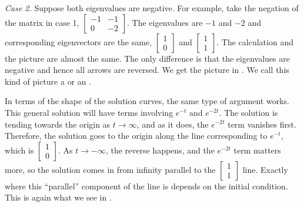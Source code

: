 \medskip

\emph{Case 2.} Suppose both eigenvalues are negative.  For example, take
the
negation of the matrix in case 1,
$\left[ \begin{smallmatrix} -1 & -1 \\ 0 & -2 \end{smallmatrix} \right]$.
The eigenvalues are $-1$ and $-2$ and corresponding eigenvectors are
the same,
$\left[ \begin{smallmatrix} 1 \\ 0 \end{smallmatrix} \right]$ and
$\left[ \begin{smallmatrix} 1 \\ 1 \end{smallmatrix} \right]$.  The
calculation and the picture are almost the same.  The only difference is that
the eigenvalues are negative and hence all arrows are reversed.  We get the
picture in .  We call this kind of picture a
\emph{} or an \emph{}.

\begin{myfig}
\parbox[t]{3.0in}{
 \capstart
 \caption{Example sink vector field with eigenvectors and
 solutions.\label{pln:sink-fullfig}}
}
\quad
\parbox[t]{3.0in}{
 \capstart
 \caption{Example saddle vector field with eigenvectors and
 solutions.\label{pln:saddle-fullfig}}
}
\end{myfig}

In terms of the shape of the solution curves, the same type of argument works. This general solution will have terms involving $e^{-t}$ and $e^{-2t}$. The solution is tending towards the origin as $t \rightarrow \infty$, and as it does, the $e^{-2t}$ term vanishes first. Therefore, the solution goes to the origin along the line corresponding to $e^{-t}$, which is $\left[\begin{smallmatrix} 1 \\ 0 \end{smallmatrix}\right]$. As $t \rightarrow -\infty$, the reverse happens, and the $e^{-2t}$ term matters more, so the solution comes in from infinity parallel to the $\left[\begin{smallmatrix} 1 \\ 1 \end{smallmatrix}\right]$ line. Exactly where this ``parallel'' component of the line is depends on the initial condition. This is again what we see in . 


